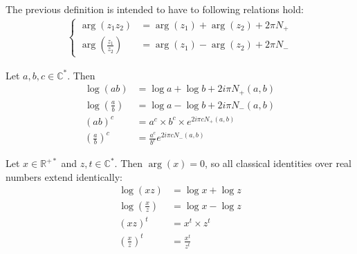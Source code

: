 \documentclass[../main.tex]{subfiles}
\begin{document}
\begin{remark}
	The previous definition is intended to have to following relations hold:
	\begin{align*}
	\begin{cases}
	\arg(z_1 z_2) &= \arg (z_1) + \arg (z_2) + 2\pi N_+\\
	\arg \left(\frac{z_1}{z_2}\right) &= \arg (z_1) - \arg (z_2) + 2\pi N_-
	\end{cases}
	\end{align*}
\end{remark}

\begin{prop}{}
	Let $a, b, c \in \mathbb{C}^*$. Then
	\begin{align*}
		\log (a b) &= \log a + \log b + 2 i \pi N_+ (a, b)\\
		\log \left(\frac{a}{b}\right) &=  \log a - \log b + 2 i \pi N_- (a, b)\\
		{(a b)}^c &= a^c \times b^c \times e^{2i\pi c N_+(a, b)}\\
		{\left(\frac{a}{b}\right)}^c &= \frac{a^c}{b^c} e^{2i\pi c N_-(a, b)}
	\end{align*}
\end{prop}

\begin{cor}{}\label{cor_log_identities}
	Let $x \in \mathbb{R}^{+*}$ and $z,t \in \mathbb{C}^*$. Then $\arg(x) = 0$, so all classical identities over real numbers extend identically:
	\begin{align*}
	\log (xz) &= \log x + \log z\\
	\log \left(\frac{x}{z}\right) &=  \log x - \log z\\
	{(x z)}^t &= x^t \times z^t\\
	{\left(\frac{x}{z}\right)}^t &= \frac{x^t}{z^t}
	\end{align*}
\end{cor}

%
%	
%
%	
%	
%
\end{document}
